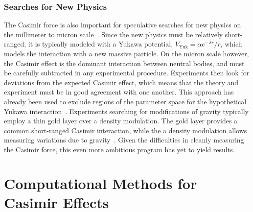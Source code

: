 \subsubsection{Searches for New Physics}

The Casimir force is also important for speculative searches for new physics on the millimeter to micron
scale~\citep{Dimopoulos2003, Bezerra2011}.  Since the new physics must be relatively short-ranged, 
it is typically modeled with a Yukawa potential, $V_{\text{Yuk}}=\alpha e^{-\lambda r}/r$,
which models the interaction with a new massive particle.    
On the micron scale however, the Casimir effect is the dominant interaction between neutral bodies,
 and must be carefully subtracted in any experimental procedure.
 Experiments then look for deviations from the expected Casimir effect, which means that the 
theory and experiment must be in good agreement with one another.  
This approach has already been used to exclude regions of the parameter space for the hypothetical
Yukawa interaction~\citep{Obrecht2007,Bezerra2011,Sushkov2011a,Chen2016}.  
Experiments searching for modifications of gravity typically employ a thin gold layer over
a density modulation.  The gold layer provides a common short-ranged Casimir interaction, while the 
a density modulation allows measuring variations due to gravity~\citep{Sorrentino2009, Geraci2015}.
Given the difficulties in cleanly measuring the Casimir force, this even more ambitious program has yet 
to yield results.  



\section{Computational Methods for Casimir Effects}
\label{sec:numerical_review}

